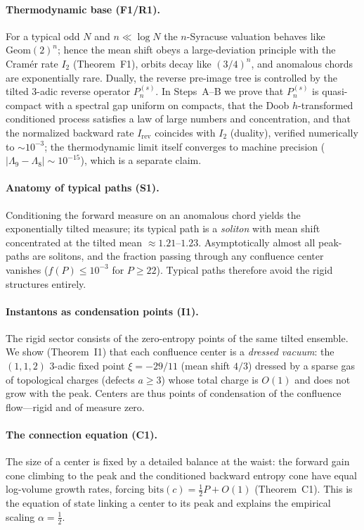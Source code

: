 \documentclass[12pt,a4paper]{article}
\begin{document}
\paragraph{Thermodynamic base (F1/R1).}
For a typical odd $N$ and $n\ll\log N$ the $n$-Syracuse valuation behaves like
$\mathrm{Geom}(2)^n$; hence the mean shift obeys a large-deviation principle
with the Cram\'er rate $I_2$ (Theorem~F1), orbits decay like $(3/4)^n$, and
anomalous chords are exponentially rare. Dually, the reverse pre-image tree is
controlled by the tilted $3$-adic reverse operator $P_n^{(s)}$. In
Steps~A--B we prove that $P_n^{(s)}$ is quasi-compact with a spectral gap
uniform on compacts, that the Doob $h$-transformed conditioned process satisfies
a law of large numbers and concentration, and that the normalized backward rate
$I_{\mathrm{rev}}$ coincides with $I_2$ (duality), verified numerically to
$\sim 10^{-3}$; the thermodynamic limit itself converges to machine precision
($|\Lambda_9-\Lambda_8|\sim 10^{-15}$), which is a separate claim.

\paragraph{Anatomy of typical paths (S1).}
Conditioning the forward measure on an anomalous chord yields the exponentially
tilted measure; its typical path is a \emph{soliton} with mean shift
concentrated at the tilted mean $\approx1.21$--$1.23$. Asymptotically almost
all peak-paths are solitons, and the fraction passing through any confluence
center vanishes ($f(P)\le10^{-3}$ for $P\ge22$). Typical paths therefore avoid
the rigid structures entirely.

\paragraph{Instantons as condensation points (I1).}
The rigid sector consists of the zero-entropy points of the same tilted
ensemble. We show (Theorem~I1) that each confluence center is a \emph{dressed
vacuum}: the $(1,1,2)$ $3$-adic fixed point $\xi=-29/11$ (mean shift $4/3$)
dressed by a sparse gas of topological charges (defects $a\ge3$) whose total
charge is $O(1)$ and does not grow with the peak. Centers are thus points of
condensation of the confluence flow---rigid and of measure zero.

\paragraph{The connection equation (C1).}
The size of a center is fixed by a detailed balance at the waist: the forward
gain cone climbing to the peak and the conditioned backward entropy cone have
equal log-volume growth rates, forcing $\mathrm{bits}(c)=\tfrac12 P+O(1)$
(Theorem~C1). This is the equation of state linking a center to its peak and
explains the empirical scaling $\alpha=\tfrac12$.
\end{document}
